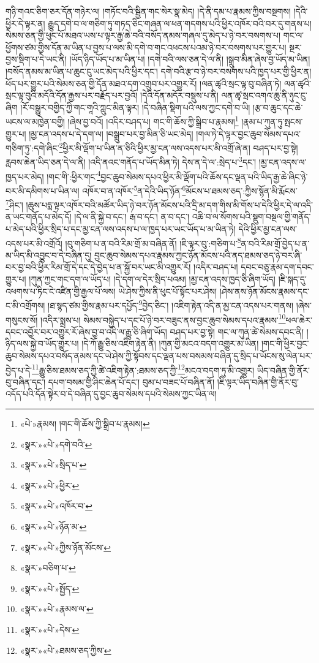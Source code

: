 གཉི་གའང་ཅིག་ཅར་དོན་གཉེར་ལ། །གཏོང་བའི་སྦྱིན་གང་སེར་སྣ་མེད། །དེ་ནི་དམ་པ་རྣམས་ཀྱིས་བསྔགས། །དེའི་ཕྱིར་དེ་ལྟར་ན། རྒྱུད་དགེ་བ་ལ་གཅིག་ཏུ་གཏད་ཅིང་གཞན་ལ་ཕན་གདགས་པའི་ཕྱིར་འཁོར་བའི་བར་དུ་གནས་པ། སེམས་ཅན་གྱི་ཕུང་པོ་མཐའ་ཡས་པ་ལྟར་རྒྱ་ཆེ་བའི་བསོད་ནམས་གཞལ་དུ་མེད་པ་ཉེ་བར་བསགས་པ། གང་ལ་ཕྱོགས་ཙམ་གྱིས་དོན་མ་ཡིན་པ་བྱས་པ་ལས་མི་དགེ་བ་གང་འཕངས་པའམ་ཉེ་བར་བསགས་པར་གྱུར་པ། སྔར་བྱས་སྡིག་པ་དེ་ཡང་ནི། །ཡོད་ཉིད་ཡོད་པ་མ་ཡིན་པ། །དགེ་བའི་ལས་ཅན་དེ་ལ་ནི། །སྒྲུབ་མིན་ཞེས་བྱ་ཡོད་མ་ཡིན། །བསོད་ནམས་མ་ཡིན་པ་ཆུང་ངུ་ཡང་མེད་པའི་ཕྱིར་དང་། དགེ་བའི་རྩ་བ་ཉེ་བར་བསགས་པའི་ཁྱད་པར་གྱི་ཕྱིར་ན། ཕོད་པར་གྱུར་པའི་སེམས་ཅན་གྱི་དོན་མཐའ་དག་འགྲུབ་པར་འགྱུར་རོ། །ལན་ཚྭའི་སྲང་ལྟ་བུ་བཞིན་ཏེ། ལན་ཚྭའི་སྲང་ལྟ་བུའི་མདོའི་དོན་རྒྱས་པར་བརྗོད་པར་བྱའོ། །དེའི་དོན་མདོར་བསྡུས་པ་ནི། ལན་ཚྭ་སྲང་འགའ་ཆུ་ནི་ཉུང་ངུ་ཞིག །རོ་བསྒྱུར་བགྱིད་ཀྱི་གང་གཱའི་ཀླུང་མིན་ལྟར། །དེ་བཞིན་སྡིག་པའི་ལས་ཀྱང་དགེ་བ་ཡི། །རྩ་བ་ཆུང་དང་ཆེ་ཡངས་ལ་མཁྱེན་བགྱི། །ཞེས་བྱ་བའོ། །འདིར་བཤད་པ། གང་གི་ཆོས་ཀྱི་སྒྲིབ་པ་རྣམས།\footnote{«པེ་»རྣམས། །གང་གི་ཆོས་ཀྱི་སྒྲིབ་པ་རྣམས།} །རྣམ་པ་ཀུན་ཏུ་སྤངས་གྱུར་པ། །མྱ་ངན་འདས་པ་དེ་དག་ལ། །བསྒྲུབ་པར་བྱ་མིན་ཅི་ཡང་མེད། །གལ་ཏེ་དེ་ལྟར་བྱང་ཆུབ་སེམས་དཔའ་གཅིག་ཏུ་:དགེ་ཞིང་\footnote{«སྣར་»«པེ་»དགེ་བའི་}ཕྱིར་མི་ལྡོག་པ་ཡིན་ན་ཅིའི་ཕྱིར་མྱ་ངན་ལས་འདས་པར་མི་འགྲོ་ཞེ་ན། བཤད་པར་བྱ་སྟེ། རླབས་ཆེན་ཡིད་ཅན་དེ་ལ་ནི། །འདི་ནའང་གནོད་པ་ཡོད་མིན་ཏེ། དེས་ན་དེ་ལ་:སྲེད་པ་\footnote{«སྣར་»«པེ་»སྲིད་པ་}དང་། །མྱ་ངན་འདས་ལ་ཁྱད་པར་མེད། །གང་གི་:ཕྱིར་གང་\footnote{«སྣར་»«པེ་»ཕྱིར་}བྱང་ཆུབ་སེམས་དཔའ་ཕྱིར་མི་ལྡོག་པའི་ཆོས་དང་ལྡན་པའི་ཡིད་རྒྱ་ཆེ་ཞིང་ཉེ་བར་མི་དམིགས་པ་ཡིན་ལ། འཁོར་བ་ན་འཁོར་\footnote{«སྣར་»«པེ་»འཁོར་བ་}ན་དེའི་ཡིད་ཉོན་\footnote{«སྣར་»«པེ་»ཉོན་མ་}མོངས་པ་ཐམས་ཅད་:ཀྱིས་སྙོན་མི་རྨོངས་\footnote{«སྣར་»«པེ་»ཀྱིས་ཉོན་མོངས་}ཤིང་། །ཆུས་པདྨ་ལྟར་འཁོར་བའི་མཚོར་ཡིད་ཉེ་བར་ཉོན་མོངས་པའི་དྲི་མ་དག་གིས་མི་གོས་པ་དེའི་ཕྱིར་དེ་ལ་འདི་ན་ཡང་གནོད་པ་མེད་དོ། །དེ་ལ་ནི་སྐྱེ་བ་དང་། རྒ་བ་དང་། ན་བ་དང་། འཆི་བ་ལ་སོགས་པའི་སྡུག་བསྔལ་གྱི་གནོད་པ་མེད་པའི་ཕྱིར་སྲིད་པ་དང་མྱ་ངན་ལས་འདས་པ་ལ་ཁྱད་པར་ཡང་ཡོད་པ་མ་ཡིན་ཏེ། དེའི་ཕྱིར་མྱ་ངན་ལས་འདས་པར་མི་འགྲོའོ། །བུ་གཅིག་པ་ན་བའི་རིམ་གྲོ་མ་བཞིན་ནོ། །ཇི་ལྟར་བུ་:གཅིག་པ་\footnote{«སྣར་»བཅིག་པ་}ན་བའི་རིམ་གྲོ་བྱེད་པ་ན་མ་ཡིད་མི་འབྱུང་བ་དེ་བཞིན་དུ། བྱང་ཆུབ་སེམས་དཔའ་རྣམས་ཀྱང་ཉོན་མོངས་པའི་ནད་ཐམས་ཅད་ཉེ་བར་ཞི་བར་བྱ་བའི་ཕྱིར་རིམ་གྲོ་དེ་དང་དེ་བྱེད་པ་ན་སྐྱོ་བར་ཡང་མི་འགྱུར་རོ། །འདིར་བཤད་པ། དབང་བཅུ་རྣམ་དག་དབང་གྱུར་པ། །ཀུན་ཀྱང་གང་དག་ལ་ཡོད་པ། །དེ་དག་ལ་དེར་སྲིད་པའམ། །མྱ་ངན་འདས་ཁྱད་ཅི་ཞིག་ཡོད། །ཇི་སྐད་དུ་འཕགས་པ་ཏིང་ངེ་འཛིན་གྱི་རྒྱལ་པོ་ལས། ཡེ་ཤེས་ཀྱིས་ནི་ཕུང་པོ་སྟོང་པར་ཤེས། །ཤེས་ནས་ཉོན་མོངས་རྣམས་དང་ང་མི་འགྲོགས། །ཐ་སྙད་ཙམ་གྱིས་རྣམ་པར་དཔྱོད་\footnote{«སྣར་»«པེ་»སྤྱོད་}བྱེད་ཅིང་། །འཇིག་རྟེན་འདི་ན་མྱ་ངན་འདས་པར་གནས། །ཞེས་གསུངས་སོ། །འདིར་སྨྲས་པ། སེམས་བསྐྱེད་པ་དང་པོ་ཉེ་བར་བཟུང་ནས་བྱང་ཆུབ་སེམས་དཔའ་རྣམས་\footnote{«སྣར་»«པེ་»རྣམས་ལ་}ཕལ་ཆེར་དབང་འབྱོར་བར་འགྱུར་རོ་ཞེས་བྱ་བ་འདི་ལ་རྒྱུ་ཅི་ཞིག་ཡོད། བཤད་པར་བྱ་སྟེ། གང་ལ་ཀུན་ཚེ་སེམས་དབང་ནི། །ཉིད་ལས་སྐྱེ་བ་ཡོད་གྱུར་པ། །དེ་ཀོ་རྒྱུ་ཅིས་འཇིག་རྟེན་ནི། །ཀུན་གྱི་མངའ་བདག་འགྱུར་མ་ཡིན། །གང་གི་ཕྱིར་བྱང་ཆུབ་སེམས་དཔའ་བསོད་ནམས་དང་ཡེ་ཤེས་ཀྱི་སྟོབས་དང་ལྡན་པས་བསམས་བཞིན་དུ་སྲིད་པ་ཡོངས་སུ་ལེན་པར་བྱེད་པ་དེ་\footnote{«སྣར་»«པེ་»དེས་}རྒྱུ་ཅིས་ཐམས་ཅད་ཀྱི་ཚེ་འཇིག་རྟེན་:ཐམས་ཅད་ཀྱི་\footnote{«སྣར་»«པེ་»ཐམས་ཅད་ཀྱིས་}མངའ་བདག་ཏུ་མི་འགྱུར། ཡིད་བཞིན་གྱི་ནོར་བུ་བཞིན་དང་། དཔག་བསམ་གྱི་ཤིང་ཆེན་པོ་དང་། བུམ་པ་བཟང་པོ་བཞིན་ནོ། །ཇི་ལྟར་ཡིད་བཞིན་གྱི་ནོར་བུ་འདོད་པའི་དོན་སྟེར་བ་དེ་བཞིན་དུ་བྱང་ཆུབ་སེམས་དཔའི་སེམས་ཀྱང་ཡིན་ལ། 